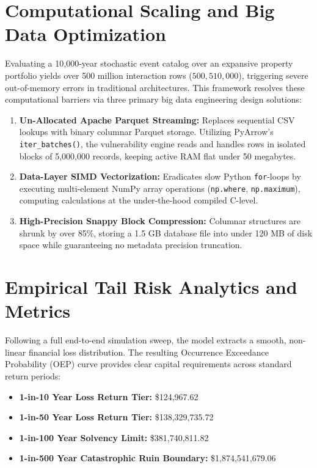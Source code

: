 \documentclass[11pt,article]{article}
\begin{document}
\section{Computational Scaling and Big Data Optimization}
Evaluating a 10,000-year stochastic event catalog over an expansive property portfolio yields over 500 million interaction rows ($500,510,000$), triggering severe out-of-memory errors in traditional architectures. This framework resolves these computational barriers via three primary big data engineering design solutions:
\begin{enumerate}
    \item \textbf{Un-Allocated Apache Parquet Streaming:} Replaces sequential CSV lookups with binary columnar Parquet storage. Utilizing PyArrow's \texttt{iter\_batches()}, the vulnerability engine reads and handles rows in isolated blocks of 5,000,000 records, keeping active RAM flat under 50 megabytes.
    \item \textbf{Data-Layer SIMD Vectorization:} Eradicates slow Python \texttt{for}-loops by executing multi-element NumPy array operations (\texttt{np.where}, \texttt{np.maximum}), computing calculations at the under-the-hood compiled C-level.
    \item \textbf{High-Precision Snappy Block Compression:} Columnar structures are shrunk by over 85\%, storing a 1.5 GB database file into under 120 MB of disk space while guaranteeing no metadata precision truncation.
\end{enumerate}

\section{Empirical Tail Risk Analytics and Metrics}
Following a full end-to-end simulation sweep, the model extracts a smooth, non-linear financial loss distribution. The resulting Occurrence Exceedance Probability (OEP) curve provides clear capital requirements across standard return periods:
\begin{itemize}
    \item \textbf{1-in-10 Year Loss Return Tier:} \$124,967.62
    \item \textbf{1-in-50 Year Loss Return Tier:} \$138,329,735.72
    \item \textbf{1-in-100 Year Solvency Limit:} \$381,740,811.82
    \item \textbf{1-in-500 Year Catastrophic Ruin Boundary:} \$1,874,541,679.06
\end{itemize}
\end{document}
